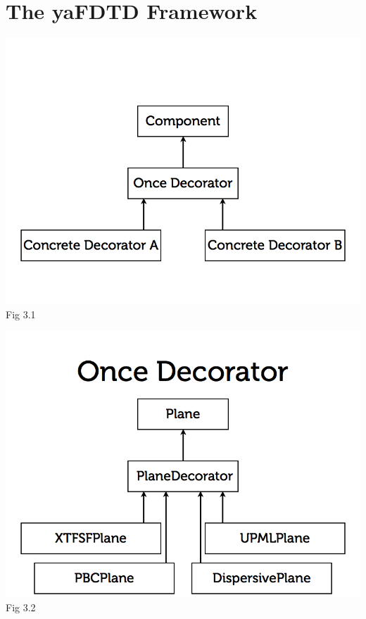 \documentclass[openany]{book}
\begin{document}
\chapter{The yaFDTD Framework}








\clearpage
\begin{center}
\includegraphics[scale=0.5]{images/once-decorator.jpg}\\
Fig 3.1
\end{center}
\begin{center}
\includegraphics[scale=0.5]{images/once-decorator-yafdtd.png}\\
Fig 3.2
\end{center}
\end{document}

